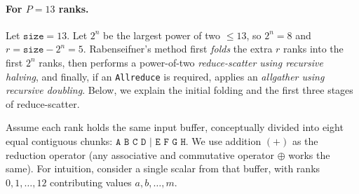 \documentclass[12pt]{book}
\begin{document}
\paragraph{For $P=13$ ranks.}
Let \(\texttt{size}=13\). Let \(2^n\) be the largest power of two \(\le 13\), so \(2^n=8\) and \(r=\texttt{size}-2^n=5\).
Rabenseifner's method first \emph{folds} the extra \(r\) ranks into the first \(2^n\) ranks, then performs a power-of-two
\emph{reduce-scatter using recursive halving}, and finally, if an \texttt{Allreduce} is required, applies an \emph{allgather using recursive doubling}.
Below, we explain the initial folding and the first three stages of reduce-scatter.

\medskip
Assume each rank holds the same input buffer, conceptually divided into eight equal contiguous chunks:
\(\texttt{A B C D | E F G H}\).
We use addition \((+)\) as the reduction operator (any associative and commutative operator \(\oplus\) works the same).
For intuition, consider a single scalar from that buffer, with ranks \(0,1,\ldots,12\) contributing values \(a,b,\ldots,m\).
\end{document}
